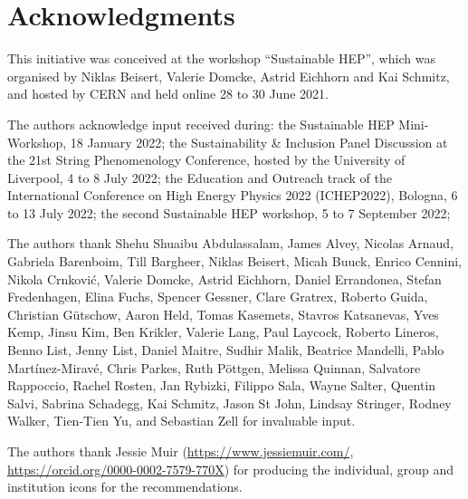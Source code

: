 \documentclass[../SustainableHEP.tex]{subfiles}
\begin{document}
\newpage


\section*{Acknowledgments}
\label{sec:Acknowledgments}
\RaggedRight
\sloppy

This initiative was conceived at the workshop “Sustainable HEP”, which was organised by Niklas Beisert, Valerie Domcke, Astrid Eichhorn and Kai Schmitz, and hosted by CERN and held online 28 to 30 June 2021.

The authors acknowledge input received during: the Sustainable HEP Mini-Workshop, 18 January 2022; the Sustainability \& Inclusion Panel Discussion at the 21st String Phenomenology Conference, hosted by the University of Liverpool, 4 to 8 July 2022; the Education and Outreach track of the International Conference on High Energy Physics 2022 (ICHEP2022), Bologna, 6 to 13 July 2022; the second Sustainable HEP workshop, 5 to 7 September 2022; 

The authors thank Shehu Shuaibu Abdulassalam, James Alvey, Nicolas Arnaud, Gabriela Barenboim, Till Bargheer, Niklas Beisert, Micah Buuck, Enrico Cennini, Nikola Crnkovi\'{c}, Valerie Domcke, Astrid Eichhorn, Daniel Errandonea, Stefan Fredenhagen, Elina Fuchs, Spencer Gessner, Clare Gratrex, Roberto Guida, Christian G\"{u}tschow, Aaron Held, Tomas Kasemets, Stavros Katsanevas, Yves Kemp, Jinsu Kim, Ben Krikler, Valerie Lang, Paul Laycock, Roberto Lineros, Benno List, Jenny List, Daniel Maitre, Sudhir Malik, Beatrice Mandelli, Pablo Mart\'{i}nez-Mirav\'{e}, Chris Parkes, Ruth Pöttgen, Melissa Quinnan, Salvatore Rappoccio, Rachel Rosten, Jan Rybizki, Filippo Sala, Wayne Salter, Quentin Salvi, Sabrina Schadegg, Kai Schmitz, Jason St John, Lindsay Stringer, Rodney Walker, Tien-Tien Yu, and Sebastian Zell for invaluable input.

The authors thank Jessie Muir (\url{https://www.jessiemuir.com/}, \url{https://orcid.org/0000-0002-7579-770X}) for producing the individual, group and institution icons for the recommendations.
\end{document}
